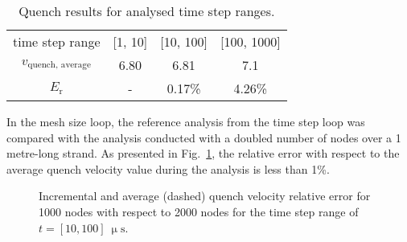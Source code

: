 \begin{table}[H]
    \caption{Quench results for analysed time step ranges.} 
    \vspace{-1.em} 
    \fontsize{10}{10}
    \selectfont 
    \renewcommand{\arraystretch}{1.5}
    \begin{center}
        \begin{tabular}{ cccc }  
        \hline
        time step range & [1, 10] & [10, 100] & [100, 1000] \\
        $v_\text{quench, average}$ & 6.80 & 6.81 & 7.1 \\
        $E_\text{r}$ & - & 0.17\% & 4.26\% \\
        \hline 
        \end{tabular}
    \end{center}  
     \label{table: 1d_qv_benchmarking_results_heat_balance_no_insulation} 
 \end{table}

In the mesh size loop, the reference analysis from the time step loop was compared with the analysis conducted with a doubled number of nodes over a 1 metre-long strand. As presented in Fig.~\ref{fig: q_vel_modelling_v_quench_rel_error_no_insulation}, the relative error with respect to the average quench velocity value during the analysis is less than 1\%. 

\begin{figure}[H]
\centering
    \caption{Incremental and average (dashed) quench velocity relative error for 1000 nodes with respect to 2000 nodes for the time step range of $t=[10, 100]~\upmu \text{s}$.}
    \label{fig: q_vel_modelling_v_quench_rel_error_no_insulation}
\end{figure}

